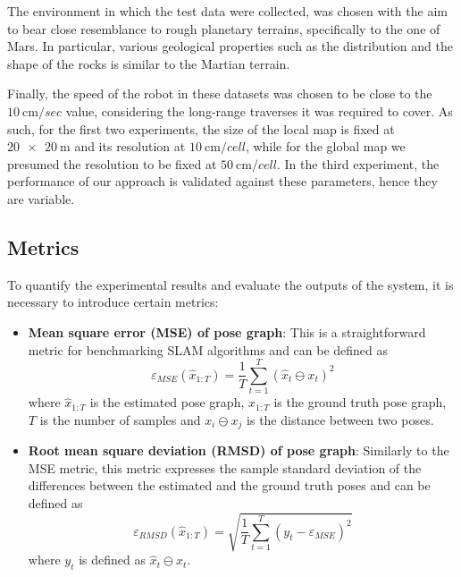 The environment in which the test data were collected, was chosen with
the aim to bear close resemblance to rough planetary terrains,
specifically to the one of Mars.
In particular, various geological properties such as the distribution
and the shape of the rocks is similar to the Martian terrain.

Finally, the speed of the robot in these datasets was chosen to be close
to the $\SI{10}{\cm \per sec}$ value, considering the long-range traverses it was
required to cover.
As such, for the first two experiments, the size of the local map is fixed at
$\SI{20 x 20}{\m}$ and its resolution at $\SI{10}{\cm \per cell}$,
while for the global map we presumed the resolution to be fixed at
$\SI{50}{\cm \per cell}$.
In the third experiment, the performance of our approach is validated against
these parameters, hence they are variable.

\subsection{Metrics} \label{metrics}

To quantify the experimental results and evaluate the outputs of the system,
it is necessary to introduce certain metrics:
\begin{itemize}
    \item \textbf{Mean square error (MSE) of pose graph}:
        This is a straightforward metric for benchmarking SLAM algorithms
        and can be defined as
        \begin{equation}
            \varepsilon_{MSE} (\hat{x}_{1:T}) = \frac{1}{T}
            \sum\limits_{t=1}^T (\hat{x}_t \ominus x_t)^2
        \end{equation}
        where
        $\hat{x}_{1:T}$ is the estimated pose graph,
        $x_{1:T}$ is the ground truth pose graph,
        $T$ is the number of samples and
        $x_i \ominus x_j$ is the distance between two poses.


    \item \textbf{Root mean square deviation (RMSD) of pose graph}:
        Similarly to the MSE metric, this metric expresses the sample
        standard deviation of the differences between the estimated and the
        ground truth poses and can be defined as
        \begin{equation}
            \varepsilon_{RMSD} (\hat{x}_{1:T}) = \sqrt{\frac{1}{T}
            \sum\limits_{t=1}^T (y_t - \varepsilon_{MSE})^2}
        \end{equation}
        where $y_t$ is defined as $\hat{x}_t \ominus x_t$.
\end{itemize}

